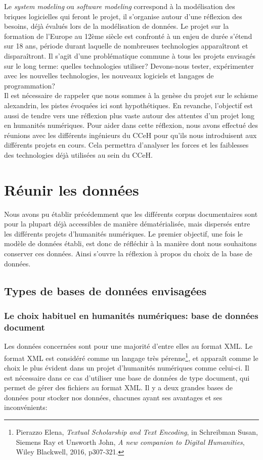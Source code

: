 Le \textit{system modeling} ou \textit{software modeling} correspond à la modélisation des briques logicielles qui feront le projet, il s’organise autour d’une réflexion des besoins, déjà évalués lors de la modélisation de données. 
Le projet sur la formation de l’Europe au 12ème siècle est confronté à un enjeu de durée s'étend sur 18 ans, période durant laquelle de nombreuses technologies apparaîtront et disparaîtront. Il s’agit d’une problématique commune à tous les projets envisagés sur le  long terme: quelles technologies utiliser?  Devons-nous tester, expérimenter avec les nouvelles technologies, les nouveaux logiciels et langages de programmation? \\
Il est nécessaire de rappeler que nous sommes à la genèse du projet sur le schisme alexandrin, les pistes évoquées ici sont hypothétiques. En revanche, l’objectif est aussi de tendre vers une réflexion plus vaste autour des attentes d’un projet long en humanités numériques. Pour aider dans cette réflexion, nous avons effectué des réunions avec les différents ingénieurs du CCeH pour qu’ils nous introduisent aux différents projets en cours. Cela permettra d’analyser les forces et les faiblesses des technologies déjà utilisées au sein du CCeH.


    
    \chapter{Réunir les données}

Nous avons pu établir précédemment que les différents corpus documentaires sont pour la plupart déjà accessibles de manière dématérialisée, mais dispersés entre les différents projets d’humanités numériques. Le premier objectif, une fois le modèle de données établi, est donc de réfléchir à la manière dont nous souhaitons conserver ces données. Ainsi s’ouvre la réflexion à propos du choix de la base de données. 

    \section{Types de bases de données envisagées}

    \subsection{Le choix habituel en humanités numériques: base de données document}

Les données concernées sont pour une majorité d’entre elles au format XML. Le format XML est considéré comme un langage très pérenne\footnote{Pierazzo Elena, \textit{Textual Scholarship and Text Encoding}, in Schreibman Susan, Siemens Ray et Unsworth John, \textit{A new companion to Digital Humanities}, Wiley Blackwell, 2016, p307-321.}, et apparaît comme le choix le plus évident dans un projet d’humanités numériques comme celui-ci. Il est nécessaire dans ce cas d’utiliser une base de données de type document, qui permet de gérer des fichiers au format XML. Il y a deux grandes bases de données pour stocker nos données, chacunes ayant ses avantages et ses inconvénients:\\

